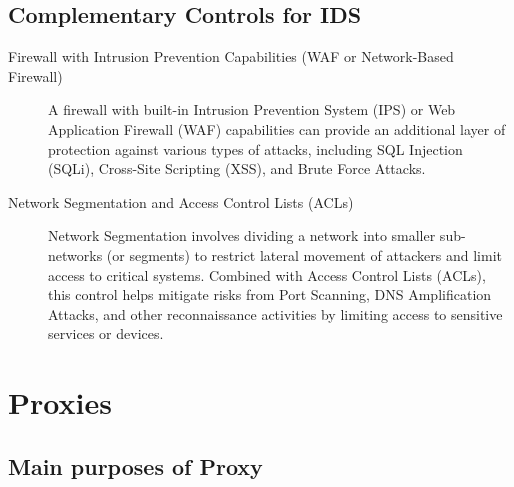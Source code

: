 \documentclass[12pt,a4paper]{report}
\begin{document}
\newpage

\subsection{Complementary Controls for IDS}

\begin{description}
	\item[Firewall with Intrusion Prevention Capabilities (WAF or Network-Based Firewall)] A firewall with built-in Intrusion Prevention System (IPS) or Web Application Firewall (WAF) capabilities can provide an additional layer of protection against various types of attacks, including SQL Injection (SQLi), Cross-Site Scripting (XSS), and Brute Force Attacks.
	
	
	\item[Network Segmentation and Access Control Lists (ACLs)] Network Segmentation involves dividing a network into smaller sub-networks (or segments) to restrict lateral movement of attackers and limit access to critical systems. Combined with Access Control Lists (ACLs), this control helps mitigate risks from Port Scanning, DNS Amplification Attacks, and other reconnaissance activities by limiting access to sensitive services or devices.
	
\end{description}


\section{Proxies}
\subsection{Main purposes of Proxy}
\end{document}
